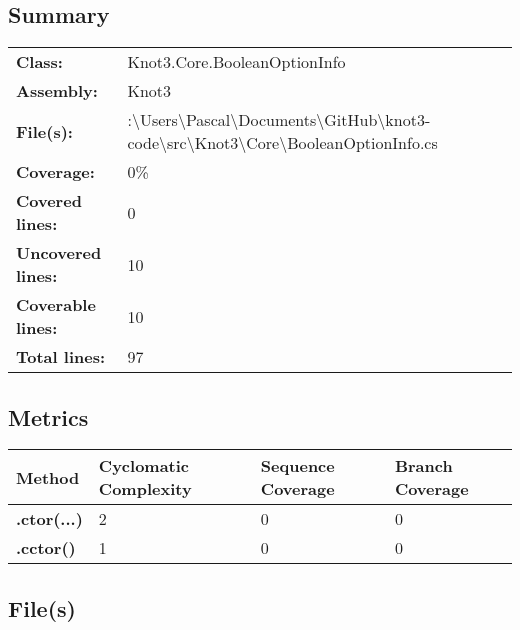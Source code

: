 \documentclass[a4paper,10pt]{article}
\begin{document}
\subsection{Summary}
\begin{longtable}[l]{ll}
\textbf{Class:} & Knot3.Core.BooleanOptionInfo\\
\textbf{Assembly:} & Knot3\\
\textbf{File(s):} & \begin{minipage}[t]{12cm}{:\textbackslash Users\textbackslash Pascal\textbackslash Documents\textbackslash GitHub\textbackslash knot3-code\textbackslash src\textbackslash Knot3\textbackslash Core\textbackslash BooleanOptionInfo.cs}\end{minipage} \\
\textbf{Coverage:} & 0\%\\
\textbf{Covered lines:} & 0\\
\textbf{Uncovered lines:} & 10\\
\textbf{Coverable lines:} & 10\\
\textbf{Total lines:} & 97\\
\end{longtable}
\subsection{Metrics}
\begin{longtable}[l]{|l|l|l|l|}
\hline
\textbf{Method} & \textbf{Cyclomatic Complexity} & \textbf{Sequence Coverage} & \textbf{Branch Coverage}\\
\hline
\textbf{.ctor(...)} & 2 & 0 & 0\\
\hline
\textbf{.cctor()} & 1 & 0 & 0\\
\hline
\end{longtable}
\subsection{File(s)}
\end{document}

